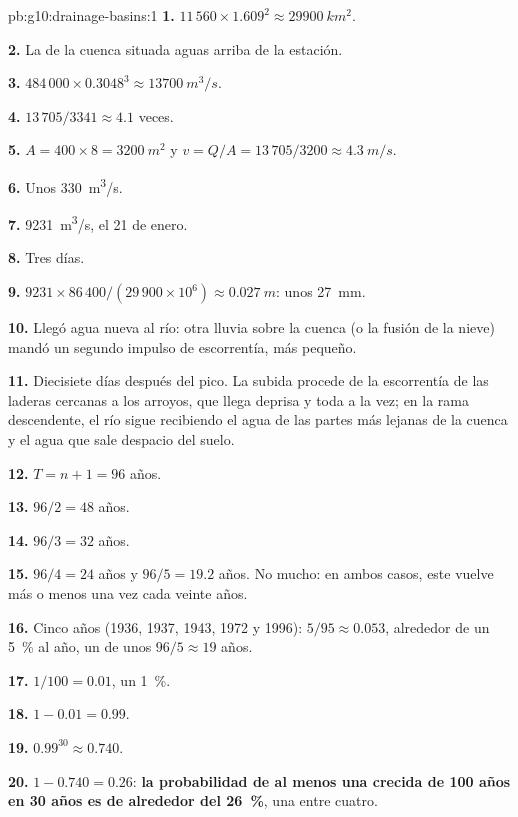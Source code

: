 \begin{solution}{pb:g10:drainage-basins:1}
\textbf{1.} $11\,560 \times 1.609^2 \approx \qty{29900}{km^2}$.

\textbf{2.} La  de la cuenca situada aguas arriba de la
estación.

\textbf{3.} $484\,000 \times 0.3048^3 \approx \qty{13700}{m^3/s}$.

\textbf{4.} $13\,705/3341 \approx 4.1$ veces.

\textbf{5.} $A = 400 \times 8 = \qty{3200}{m^2}$ y $v = Q/A = 13\,705/3200
\approx \qty{4.3}{m/s}$.

\textbf{6.} Unos \qty{330}{m^3/s}.

\textbf{7.} \qty{9231}{m^3/s}, el 21 de enero.

\textbf{8.} Tres días.

\textbf{9.} $9231 \times 86\,400/(29\,900 \times 10^6) \approx
\qty{0.027}{m}$: unos \qty{27}{mm}.

\textbf{10.} Llegó agua nueva al río: otra lluvia sobre la cuenca (o la
fusión de la nieve) mandó un segundo impulso de escorrentía, más pequeño.

\textbf{11.} Diecisiete días después del pico. La subida procede de la
escorrentía de las laderas cercanas a los arroyos, que llega deprisa y toda a
la vez; en la rama descendente, el río sigue recibiendo el agua de las partes
más lejanas de la cuenca y el agua que sale despacio del suelo.

\textbf{12.} $T = n + 1 = 96$ años.

\textbf{13.} $96/2 = 48$ años.

\textbf{14.} $96/3 = 32$ años.

\textbf{15.} $96/4 = 24$ años y $96/5 = 19.2$ años. No mucho: en ambos casos,
este  vuelve más o menos una vez cada veinte años.

\textbf{16.} Cinco años (1936, 1937, 1943, 1972 y 1996): $5/95 \approx
0.053$, alrededor de un \qty{5}{\percent} al año, un  de
unos $96/5 \approx 19$ años.

\textbf{17.} $1/100 = 0.01$, un \qty{1}{\percent}.

\textbf{18.} $1 - 0.01 = 0.99$.

\textbf{19.} $0.99^{30} \approx 0.740$.

\textbf{20.} $1 - 0.740 = 0.26$: \textbf{la probabilidad de al menos una
crecida de 100 años en 30 años es de alrededor del \qty{26}{\percent}}, una
entre cuatro.
\end{solution}
